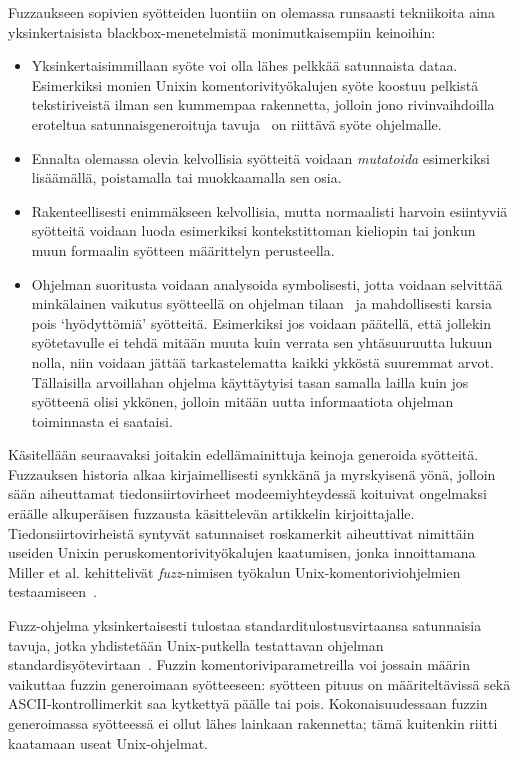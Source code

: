Fuzzaukseen sopivien syötteiden luontiin on olemassa runsaasti tekniikoita
aina yksinkertaisista blackbox-menetelmistä monimutkaisempiin keinoihin:
\begin{itemize}
    \item Yksinkertaisimmillaan syöte voi olla lähes pelkkää satunnaista dataa.
          Esimerkiksi monien Unixin komentorivityökalujen syöte koostuu pelkistä tekstiriveistä
          ilman sen kummempaa rakennetta,
          jolloin jono rivinvaihdoilla eroteltua satunnaisgeneroituja
          tavuja~\cite{UnixReliability} on riittävä syöte ohjelmalle.
    \item Ennalta olemassa olevia kelvollisia syötteitä voidaan \emph{mutatoida} esimerkiksi
          lisäämällä, poistamalla tai muokkaamalla sen osia.
    \item Rakenteellisesti enimmäkseen kelvollisia, mutta normaalisti harvoin esiintyviä syötteitä voidaan
          luoda esimerkiksi kontekstittoman kieliopin tai jonkun muun formaalin syötteen määrittelyn perusteella.
    \item Ohjelman suoritusta voidaan analysoida symbolisesti, jotta voidaan
          selvittää minkälainen vaikutus syötteellä on ohjelman tilaan~\cite{SageArtikkeli}
          ja mahdollisesti karsia pois `hyödyttömiä' syötteitä.
          Esimerkiksi jos voidaan päätellä, että jollekin syötetavulle ei tehdä mitään muuta kuin
          verrata sen yhtäsuuruutta lukuun nolla,
          niin voidaan jättää tarkastelematta kaikki ykköstä suuremmat arvot.
          Tällaisilla arvoillahan ohjelma käyttäytyisi tasan samalla lailla
          kuin jos syötteenä olisi ykkönen,
          jolloin mitään uutta informaatiota ohjelman toiminnasta ei saataisi.

\end{itemize}

\fixme[wut?]
Kä\-si\-tel\-lään seuraavaksi joitakin e\-del\-lä\-mai\-nit\-tu\-ja keinoja generoida syötteitä.
Fuzzauksen historia alkaa kirjaimellisesti synkkänä ja myrskyisenä yönä,
jolloin sään aiheuttamat tiedonsiirtovirheet modeemiyhteydessä koituivat ongelmaksi
eräälle alkuperäisen fuzzausta käsittelevän artikkelin kirjoittajalle\cite{UnixReliability}.
Tiedonsiirtovirheistä syntyvät satunnaiset roskamerkit aiheuttivat nimittäin
useiden Unixin peruskomentorivityökalujen kaatumisen,
jonka innoittamana Miller et al. kehittelivät \emph{fuzz}-nimisen työkalun Unix-komentoriviohjelmien testaamiseen~\cite{UnixReliability}.

Fuzz-ohjelma yksinkertaisesti tulostaa standarditulostusvirtaansa satunnaisia tavuja,
jotka yhdistetään Unix-putkella testattavan ohjelman standardisyötevirtaan~\cite{UnixReliability}.
Fuzzin komentoriviparametreilla voi jossain määrin vaikuttaa fuzzin generoimaan syötteeseen:
syötteen pituus on määriteltävissä sekä ASCII-kontrollimerkit saa kytkettyä päälle tai pois.
Kokonaisuudessaan fuzzin generoimassa syötteessä ei ollut lähes lainkaan rakennetta;
tämä kuitenkin riitti kaatamaan useat Unix-ohjelmat.

